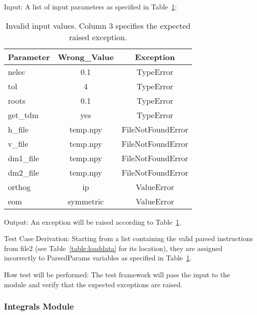 \documentclass[12pt, titlepage]{article}
\begin{document}
\begin{enumerate}
	Input: A list of input parameters as specified in 
	Table~\ref{table:wrongcases}:
	\begin{table}[h!]
		\centering
		\begin{tabular}{lcc}
			Parameter & Wrong\_Value &     Exception     \\
			\toprule
			nelec      &     0.1      &     TypeError     \\
			tol        &      4       &     TypeError     \\
			roots      &     0.1      &     TypeError     \\
			get\_tdm   &     yes      &     TypeError     \\
			h\_file    &   temp.npy   & FileNotFoundError \\
			v\_file    &   temp.npy   & FileNotFoundError \\
			dm1\_file  &   temp.npy   & FileNotFoundError \\
			dm2\_file  &   temp.npy   & FileNotFoundError \\
			orthog     &      ip      &    ValueError     \\
			eom        &  symmetric   &    ValueError\\
			\bottomrule
		\end{tabular}
		\caption{Invalid input values.  Column 3 
			specifies the expected raised exception.}
		\label{table:wrongcases}
	\end{table}
	
	Output: An exception will be raised according to 
	Table~\ref{table:wrongcases}.
	
	Test Case Derivation: Starting from a list containing the valid parsed 
	instructions from file2 (see Table~\ref{table:loaddata} for its location), 
	they are assigned incorrectly to ParsedParams variables as specified in 
	Table~\ref{table:wrongcases}.
	
	How test will be performed: The test framework will pass the input to 
	the module and verify that the expected exceptions are raised.
	
\end{enumerate}

\subsubsection{Integrals Module}
\label{sec:M4}
\end{document}
